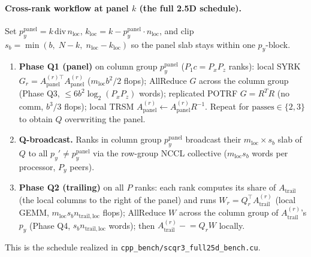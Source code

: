 \documentclass[11pt]{article}
\begin{document}
\paragraph{Cross-rank workflow at panel $k$ (the full 2.5D schedule).}
Set $p_y^{\text{panel}} = k \,\mathrm{div}\, n_{\mathrm{loc}}$,
$k_{\text{loc}} = k - p_y^{\text{panel}} \cdot n_{\mathrm{loc}}$,
and clip $s_b = \min(b,\; N-k,\; n_{\mathrm{loc}} - k_{\text{loc}})$ so
the panel slab stays within one $p_y$-block.
\begin{enumerate}[leftmargin=2em, itemsep=0.2em]
\item \textbf{Phase Q1 (panel)} on column group $p_y^{\text{panel}}$
      ($P_1 c = P_x P_z$ ranks):
      local SYRK $G_r \!=\! A_{\text{panel}}^{(r)\top} A_{\text{panel}}^{(r)}$
      ($m_{\mathrm{loc}} b^2 / 2$ flops);
      AllReduce $G$ across the column group (Phase Q3,
      $\le 6 b^2 \log_2(P_x P_z)$ words);
      replicated POTRF $G = R^T R$ (no comm, $b^3/3$ flops);
      local TRSM $A_{\text{panel}}^{(r)} \leftarrow A_{\text{panel}}^{(r)} R^{-1}$.
      Repeat for $\mathrm{passes} \in \{2, 3\}$ to obtain $Q$ overwriting
      the panel.
\item \textbf{Q-broadcast.} Ranks in column group $p_y^{\text{panel}}$
      broadcast their $m_{\mathrm{loc}} \times s_b$ slab of $Q$ to all
      $p_y' \ne p_y^{\text{panel}}$ via the row-group NCCL collective
      ($m_{\mathrm{loc}} s_b$ words per processor, $P_y$ peers).
\item \textbf{Phase Q2 (trailing)} on all $P$ ranks: each rank computes
      its share of $A_{\text{trail}}$ (the local columns to the right of
      the panel) and runs
      $W_r = Q_r^\top A_{\text{trail}}^{(r)}$ (local GEMM,
      $m_{\mathrm{loc}} s_b n_{\mathrm{trail, loc}}$ flops);
      AllReduce $W$ across the column group of $A_{\text{trail}}^{(r)}$'s
      $p_y$ (Phase Q4, $s_b n_{\mathrm{trail, loc}}$ words);
      then $A_{\text{trail}}^{(r)} \mathrel{-}=\!Q_r W$ locally.
\end{enumerate}
This is the schedule realized in
\texttt{cpp\_bench/scqr3\_full25d\_bench.cu}.
\end{document}
